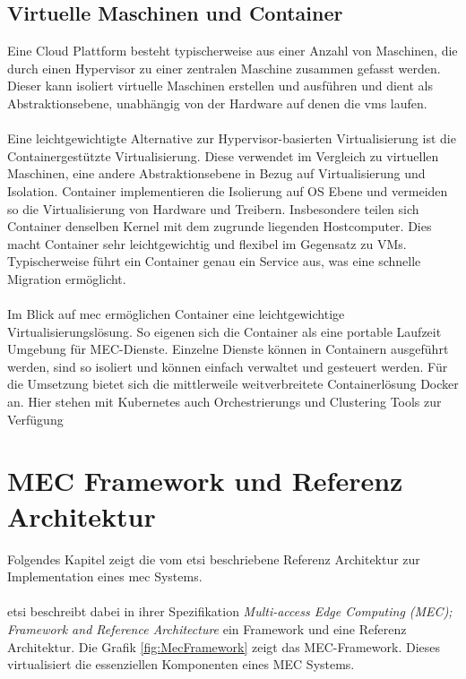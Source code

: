 \documentclass[runningheads]{llncs}
\numberwithin{figure}{section}
\begin{document}
\subsection{Virtuelle Maschinen und Container}
\label{subsec:Virtuelle Maschinen und Container}
Eine Cloud Plattform besteht typischerweise aus einer Anzahl von Maschinen, 
die durch einen Hypervisor zu einer zentralen Maschine zusammen gefasst werden.
Dieser kann isoliert virtuelle Maschinen erstellen und ausführen und dient als Abstraktionsebene, 
unabhängig von der Hardware auf denen die \acrshort{vm}s laufen.
\\
\\
Eine leichtgewichtigte Alternative zur Hypervisor-basierten Virtualisierung ist die Containergestützte Virtualisierung. 
Diese verwendet im Vergleich zu virtuellen Maschinen, eine andere Abstraktionsebene in Bezug auf Virtualisierung und Isolation. 
Container implementieren die Isolierung auf OS Ebene und vermeiden so die Virtualisierung von Hardware und Treibern. 
Insbesondere teilen sich Container denselben Kernel mit dem zugrunde liegenden Hostcomputer. 
Dies macht Container sehr leichtgewichtig und flexibel im 
Gegensatz zu VMs. Typischerweise führt ein Container genau ein Service aus, was eine schnelle Migration ermöglicht.
\\
\\
Im Blick auf \acrshort{mec} ermöglichen Container eine leichtgewichtige Virtualisierungslösung. So eigenen sich die Container
als eine portable Laufzeit Umgebung für MEC-Dienste. 
Einzelne Dienste können in Containern ausgeführt werden, sind so isoliert und können einfach 
verwaltet und gesteuert werden. Für die Umsetzung bietet sich die mittlerweile weitverbreitete Containerlösung Docker an. Hier stehen mit 
Kubernetes auch Orchestrierungs  und Clustering Tools zur Verfügung \cite{morabitoConsolidateIoTEdge2018}



\newpage
\section{MEC Framework und Referenz Architektur}
\label{subsec:MEC Framework - Referenz Architektur}
Folgendes Kapitel zeigt die vom \acrfull{etsi} beschriebene
Referenz Architektur zur Implementation eines \acrshort{mec} Systems. 
\\ 
\\
\acrshort{etsi} beschreibt dabei in ihrer Spezifikation \textit{Multi-access Edge Computing (MEC); 
Framework and Reference Architecture} \cite{etsiETSIGSMEC} ein Framework und eine 
Referenz Architektur. Die Grafik \ref{fig:MecFramework} zeigt das MEC-Framework. Dieses virtualisiert die essenziellen Komponenten eines 
MEC Systems.
\end{document}
